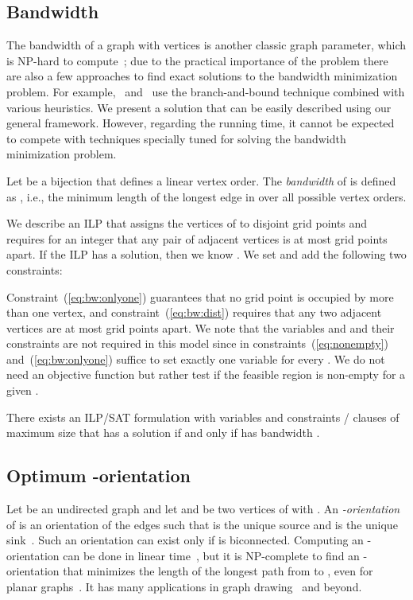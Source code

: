 \documentclass[runningheads]{llncs}
\newcounter{constr}
\begin{document}
\subsection{Bandwidth}\label{sec:bandwidth}
The bandwidth of a graph  with  vertices is another classic graph parameter, which is NP-hard to compute~\cite{ccdg-bpgms-82}; due to the practical importance of the problem there are also a few approaches to find exact solutions to the bandwidth minimization problem.
For example,~\cite{bandwidth-exact} and~\cite{mcp-bbambm-08} use the
branch-and-bound technique combined with various heuristics. We
present a solution that can be easily described using our general
framework. However, regarding the running time, it cannot be expected
to compete with techniques specially tuned for solving the bandwidth
minimization problem.

Let  be a bijection that defines a
linear vertex order. The \emph{bandwidth} of  is defined as ,
i.e., the minimum length of the longest edge in  over all possible
vertex orders.


We describe an ILP that assigns the vertices of  to disjoint grid
points  and requires for an integer  that any pair of adjacent
vertices is at most  grid points apart. If the ILP has a solution,
then we know . We set  and add the
following two constraints:

Constraint~(\ref{eq:bw:onlyone}) guarantees that no grid point is
occupied by more than one vertex, and constraint~(\ref{eq:bw:dist})
requires that any two adjacent vertices are at most  grid points
apart.
We note that the variables  and  and their constraints
are not required in this model since in 
constraints~(\ref{eq:nonempty}) and~(\ref{eq:bw:onlyone}) suffice to
set exactly one variable  for every .
We do not need an objective function but rather test if the feasible
region is non-empty for a given .

\begin{theorem}
There exists an ILP/SAT formulation with  variables
and  constraints /  clauses of maximum size 
that has a solution if and only if
 has bandwidth . 
\end{theorem}





\subsection{Optimum -orientation}

Let  be an undirected graph and let  and  be two vertices of
 with .  An {\em -orientation} of  is an
orientation of the edges such
that  is the unique source and  is the unique sink~\cite{ET76}.  Such an
orientation can exist only if  is biconnected. Computing an
-orientation can be done in linear time~\cite{ET76,b-eo-02}, but
it is NP-complete to find an -orientation that minimizes the
length of the longest path from  to , even for planar
graphs~\cite{SZ10}. It has many
applications in graph drawing~\cite{pt-apsto-10} and beyond.
\end{document}
